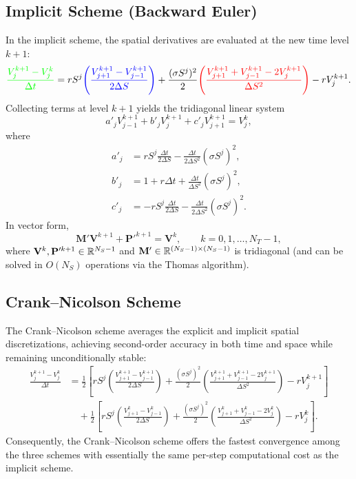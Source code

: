 \subsection{Implicit Scheme (Backward Euler)}
In the implicit scheme, the spatial derivatives are evaluated at the new time level $k + 1$:
\[
    \textcolor{green}{\frac{V_j^{k+1} - V_j^k}{\Delta t}}
    = r S^j \textcolor{blue}{\left(\frac{V_{j+1}^{k+1} - V_{j-1}^{k+1}}{2\Delta S}\right)}
    + \frac{(\sigma S^j)^2}{2} \textcolor{red}{\left(\frac{V_{j+1}^{k+1} + V_{j-1}^{k+1} - 2V_j^{k+1}}{\Delta S^2}\right)}
    - r V_j^{k+1}.
\]
Collecting terms at level $k + 1$ yields the tridiagonal linear system
\[
    a'_j V_{j-1}^{k+1} + b'_j V_j^{k+1} + c'_j V_{j+1}^{k+1} = V_j^k,
\]
where
\begin{align*}
    a'_j &= r S^j \frac{\Delta t}{2\Delta S} - \frac{\Delta t}{2\Delta S^2}(\sigma S^j)^2, \\
    b'_j &= 1 + r\Delta t + \frac{\Delta t}{\Delta S^2}(\sigma S^j)^2, \\
    c'_j &= -r S^j \frac{\Delta t}{2\Delta S} - \frac{\Delta t}{2\Delta S^2}(\sigma S^j)^2.
\end{align*}
In vector form,
\[
    \mathbf{M}' \mathbf{V}^{k+1} + \mathbf{P}'^{k+1} = \mathbf{V}^k, \qquad k = 0, 1, \dots, N_T - 1,
\]
where $\mathbf{V}^k, \mathbf{P}'^{k+1} \in \mathbb{R}^{N_S - 1}$ and $\mathbf{M}' \in \mathbb{R}^{(N_S - 1) \times (N_S - 1)}$ is tridiagonal (and can be solved in $O(N_S)$ operations via the Thomas algorithm).

\subsection{Crank--Nicolson Scheme}
The Crank--Nicolson scheme averages the explicit and implicit spatial discretizations, achieving second-order accuracy in both time and space while remaining unconditionally stable:
\begin{align*}
    \frac{V_j^{k+1} - V_j^k}{\Delta t}
    &= \frac{1}{2}\left[
        r S^j \left(\frac{V_{j+1}^{k+1} - V_{j-1}^{k+1}}{2\Delta S}\right)
        + \frac{(\sigma S^j)^2}{2}\left(\frac{V_{j+1}^{k+1} + V_{j-1}^{k+1} - 2V_j^{k+1}}{\Delta S^2}\right)
        - r V_j^{k+1}
    \right] \\
    &\quad + \frac{1}{2}\left[
        r S^j \left(\frac{V_{j+1}^k - V_{j-1}^k}{2\Delta S}\right)
        + \frac{(\sigma S^j)^2}{2}\left(\frac{V_{j+1}^k + V_{j-1}^k - 2V_j^k}{\Delta S^2}\right)
        - r V_j^k
    \right].
\end{align*}
Consequently, the Crank--Nicolson scheme offers the fastest convergence among the three schemes with essentially the same per-step computational cost as the implicit scheme.

